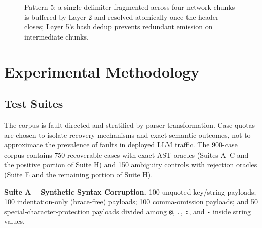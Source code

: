 \documentclass[conference]{IEEEtran}
\begin{document}
\begin{figure}[t]
\centering
{}
\caption{Pattern 5: a single delimiter fragmented across four network
chunks is buffered by Layer 2 and resolved atomically once the header
closes; Layer 5's hash dedup prevents redundant emission on intermediate
chunks.}
\label{fig:fragmentation}
\end{figure}

\section{Experimental Methodology}

\subsection{Test Suites}

The corpus is fault-directed and stratified by parser transformation. Case
quotas are chosen to isolate recovery mechanisms and exact semantic outcomes,
not to approximate the prevalence of faults in deployed LLM traffic.
The 900-case corpus contains 750 recoverable cases with exact-AST oracles
(Suites A--C and the positive portion of Suite H) and 150 ambiguity controls
with rejection oracles (Suite E and the remaining portion of Suite H).

\textbf{Suite A -- Synthetic Syntax Corruption.} 100 unquoted-key/string
payloads; 100 indentation-only (brace-free) payloads; 100 comma-omission
payloads; and 50 special-character-protection payloads divided among
\texttt{@}, \texttt{.}, \texttt{:}, and \texttt{-} inside string values.
\end{document}
